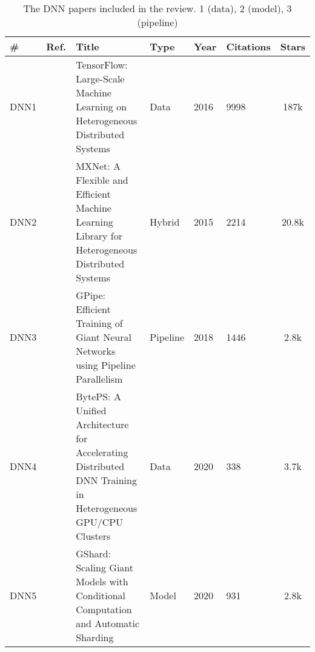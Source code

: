 \begin{table*}[th!]
	\centering
	\caption{The DNN papers included in the review. 1 (data), 2 (model), 3 (pipeline)}
	\label{tab:dnn_papers}
	\begin{tabular}{llp{8.4cm}lllc}
		\hline
		\small \textbf{\#} & \small \textbf{Ref.}                    & \small \textbf{Title}                                                                                                               & \small \textbf{Type} & \small \textbf{Year} & \small \textbf{Citations} & \small \textbf{Stars}                                                \\[1ex]
		\hline
		\small DNN1        & \small \cite{abadi_tensorflow_2016}     & \small TensorFlow: Large-Scale Machine Learning on Heterogeneous Distributed Systems                                                & \small Data          & \small 2016          & \small 9998               & \small 187k \cite{abadi_tensorflow_2015}                             \\[1ex]
		\small DNN2        & \small \cite{chen_mxnet_2015}           & \small MXNet: A Flexible and Efficient Machine Learning Library for Heterogeneous Distributed Systems                               & \small Hybrid        & \small 2015          & \small 2214               & \small 20.8k \cite{noauthor_apachemxnet_2025}                        \\[1ex]
		\small DNN3        & \small \cite{huang_gpipe_2019}          & \small GPipe: Efficient Training of Giant Neural Networks using Pipeline Parallelism                                                & \small Pipeline      & \small 2018          & \small 1446               & \small 2.8k \cite{noauthor_tensorflowlingvo_2025}                    \\[1ex]
		\small DNN4        & \small \cite{jiang_unified_nodate}      & \small BytePS: A Unified Architecture for Accelerating Distributed DNN Training in Heterogeneous GPU/CPU Clusters                   & \small Data          & \small 2020          & \small 338                & \small 3.7k \cite{noauthor_bytedancebyteps_2025}                     \\[1ex]
		\small DNN5        & \small \cite{lepikhin_gshard_2020}      & \small GShard: Scaling Giant Models with Conditional Computation and Automatic Sharding                                             & \small Model         & \small 2020          & \small 931                & \small 2.8k \cite{noauthor_tensorflowlingvo_2025}                    \\[1ex]

\end{tabular}
\end{table*}
